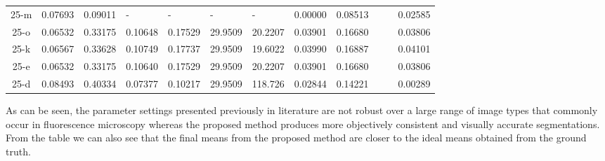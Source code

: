 \begin{footnotesize}
\begin{longtabu}{|c|X|X|X|X|X|X|X|X|X|X|X|}
\hhline{---------~~-}	25-m	&	0.07693	&	0.09011	&\centering	-	&\centering	-	&\centering	-	&	\centering-		&	0.00000	&	0.08513	&		&		&	0.02585 \\
\hhline{---------~~-}	25-o	&	0.06532	&	0.33175	&	0.10648	&	0.17529 &	29.9509	&	20.2207 	&	0.03901	&	0.16680	&		&		&	0.03806	\\
\hhline{---------~~-}	25-k	&	0.06567	&	0.33628	&	0.10749	&	0.17737	&	29.9509	&	19.6022 	&	0.03990	&	0.16887	&		&		&	0.04101	\\
\hhline{---------~~-}	25-e	&	0.06532	&	0.33175	&	0.10640	&	0.17529	&	29.9509	&	20.2207 	&	0.03901	&	0.16680	&		&		&	0.03806	\\
\hhline{---------~~-}	25-d	&	0.08493	&	0.40334	&	0.07377	&	0.10217	&	29.9509	&	118.726 	&	0.02844	&	0.14221	&		&		&	0.00289	\\
\hline 
\end{longtabu} 
\end{footnotesize}

As can be seen, the parameter settings presented previously in literature are not robust over a large range of image types that commonly occur in fluorescence microscopy whereas the proposed method produces more objectively consistent and visually accurate segmentations. From the table we can also see that the final means from the proposed method are closer to the ideal means obtained from the ground truth.

